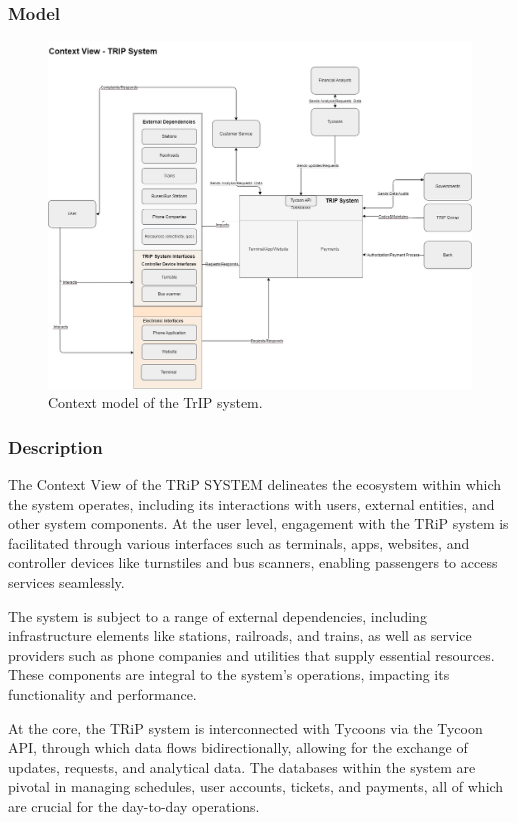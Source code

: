 \subsubsection{Model}
\begin{figure}[H]
    \centering
    \includegraphics[width=\textwidth]{drawings/views_final_version/context_view.png}
    \caption{Context model of the TrIP system.}
    \label{fig:context_view_model}
\end{figure}

\subsubsection{Description}
The Context View of the TRiP SYSTEM delineates the ecosystem within which the system operates, including its interactions with users, external entities, and other system components. At the user level, engagement with the TRiP system is facilitated through various interfaces such as terminals, apps, websites, and controller devices like turnstiles and bus scanners, enabling passengers to access services seamlessly.

The system is subject to a range of external dependencies, including infrastructure elements like stations, railroads, and trains, as well as service providers such as phone companies and utilities that supply essential resources. These components are integral to the system's operations, impacting its functionality and performance.

At the core, the TRiP system is interconnected with Tycoons via the Tycoon API, through which data flows bidirectionally, allowing for the exchange of updates, requests, and analytical data. The databases within the system are pivotal in managing schedules, user accounts, tickets, and payments, all of which are crucial for the day-to-day operations.

